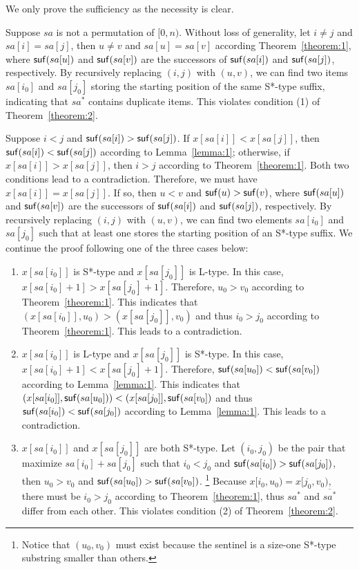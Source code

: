 \documentclass[10pt,journal,compsoc]{IEEEtran}
\begin{document}
\begin{IEEEproof}
	We only prove the sufficiency as the necessity is clear.
	
	Suppose $sa$ is not a permutation of $[0, n)$. Without loss of generality, let $i \ne j$ and $sa[i] = sa[j]$, then $u \ne v$ and $sa[u] = sa[v]$ according Theorem~\ref{theorem:1}, where ${\sf suf}(sa[u])$ and ${\sf suf}(sa[v])$ are the successors of ${\sf suf}(sa[i])$ and ${\sf suf}(sa[j])$, respectively. By recursively replacing $(i, j)$ with $(u, v)$, we can find two items $sa[i_0]$ and $sa[j_0]$ storing the starting position of the same S*-type suffix, indicating that $sa^*$ contains duplicate items. This violates condition (1) of Theorem~\ref{theorem:2}.
	
	Suppose $i < j$ and ${\sf suf}(sa[i]) > {\sf suf}(sa[j])$. If $x[sa[i]] < x[sa[j]]$, then ${\sf suf}(sa[i]) < {\sf suf}(sa[j])$ according to Lemma~\ref{lemma:1}; otherwise, if $x[sa[i]] > x[sa[j]]$, then $i > j$ according to Theorem~\ref{theorem:1}. Both two conditions lead to a contradiction. Therefore, we must have $x[sa[i]] = x[sa[j]]$. If so, then $u < v$ and ${\sf suf}(u) > {\sf suf}(v)$, where ${\sf suf}(sa[u])$ and ${\sf suf}(sa[v])$ are the successors of ${\sf suf}(sa[i])$ and ${\sf suf}(sa[j])$, respectively. By recursively replacing $(i, j)$ with $(u, v)$, we can find two elements $sa[i_0]$ and $sa[j_0]$ such that at least one stores the starting position of an S*-type suffix. We continue the proof following one of the three cases below:
	\begin{enumerate}[(1)]
	\item $x[sa[i_0]]$ is S*-type and $x[sa[j_0]]$ is L-type. In this case, $x[sa[i_0] + 1] > x[sa[j_0] + 1]$. Therefore, $u_0 > v_0$ according to Theorem~\ref{theorem:1}. This indicates that $(x[sa[i_0]], u_0) > (x[sa[j_0]], v_0)$ and thus $i_0 > j_0$ according to Theorem~\ref{theorem:1}. This leads to a contradiction.
	\item $x[sa[i_0]]$ is L-type and $x[sa[j_0]]$ is S*-type. In this case, $x[sa[i_0] + 1] < x[sa[j_0] + 1]$. Therefore, ${\sf suf}(sa[u_0]) < {\sf suf}(sa[v_0])$ according to Lemma~\ref{lemma:1}. This indicates that $(x[sa[i_0]], {\sf suf}(sa[u_0])) < (x[sa[j_0]], {\sf suf}(sa[v_0])$ and thus ${\sf suf}(sa[i_0]) < {\sf suf}(sa[j_0])$ according to Lemma~\ref{lemma:1}. This leads to a contradiction.
	\item $x[sa[i_0]]$ and $x[sa[j_0]]$ are both S*-type. Let $(i_0, j_0)$ be the pair that maximize $sa[i_0] + sa[j_0]$ such that $i_0 < j_0$ and ${\sf suf}(sa[i_0]) > {\sf suf}(sa[j_0])$, then $u_0 > v_0$ and ${\sf suf}(sa[u_0]) > {\sf suf}(sa[v_0])$. \footnote{Notice that $(u_0, v_0)$ must exist because the sentinel is a size-one S*-type substring smaller than others.} Because $x[i_0, u_0) = x[j_0, v_0)$, there must be $i_0 > j_0$ according to Theorem~\ref{theorem:1}, thus $sa^*$ and $\overline{sa^*}$ differ from each other. This violates condition (2) of Theorem~\ref{theorem:2}.
	\end{enumerate}

\end{IEEEproof}
\end{document}
